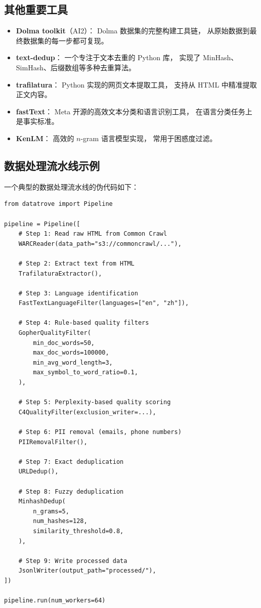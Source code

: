 \subsection{其他重要工具}

\begin{itemize}[noitemsep]
  \item \textbf{Dolma toolkit}（AI2）：
        Dolma 数据集的完整构建工具链，
        从原始数据到最终数据集的每一步都可复现。
  \item \textbf{text-dedup}：
        一个专注于文本去重的 Python 库，
        实现了 MinHash、SimHash、后缀数组等多种去重算法。
  \item \textbf{trafilatura}：
        Python 实现的网页文本提取工具，
        支持从 HTML 中精准提取正文内容。
  \item \textbf{fastText}：
        Meta 开源的高效文本分类和语言识别工具，
        在语言分类任务上是事实标准。
  \item \textbf{KenLM}：
        高效的 $n$-gram 语言模型实现，
        常用于困惑度过滤。
\end{itemize}

\subsection{数据处理流水线示例}

一个典型的数据处理流水线的伪代码如下：

\begin{lstlisting}[caption={Data processing pipeline (pseudocode)}]
from datatrove import Pipeline

pipeline = Pipeline([
    # Step 1: Read raw HTML from Common Crawl
    WARCReader(data_path="s3://commoncrawl/..."),

    # Step 2: Extract text from HTML
    TrafilaturaExtractor(),

    # Step 3: Language identification
    FastTextLanguageFilter(languages=["en", "zh"]),

    # Step 4: Rule-based quality filters
    GopherQualityFilter(
        min_doc_words=50,
        max_doc_words=100000,
        min_avg_word_length=3,
        max_symbol_to_word_ratio=0.1,
    ),

    # Step 5: Perplexity-based quality scoring
    C4QualityFilter(exclusion_writer=...),

    # Step 6: PII removal (emails, phone numbers)
    PIIRemovalFilter(),

    # Step 7: Exact deduplication
    URLDedup(),

    # Step 8: Fuzzy deduplication
    MinhashDedup(
        n_grams=5,
        num_hashes=128,
        similarity_threshold=0.8,
    ),

    # Step 9: Write processed data
    JsonlWriter(output_path="processed/"),
])

pipeline.run(num_workers=64)
\end{lstlisting}

